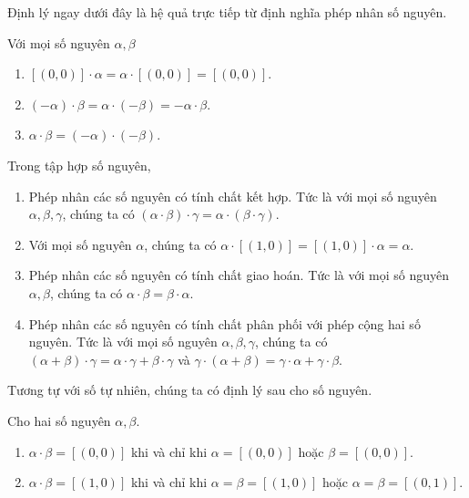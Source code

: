 Định lý ngay dưới đây là hệ quả trực tiếp từ định nghĩa phép nhân số nguyên.
\begin{theorem}
    Với mọi số nguyên $\alpha, \beta$
    \begin{enumerate}[label={(\roman*)}]
        \item $[(0, 0)]\cdot\alpha = \alpha\cdot[(0,0)] = [(0,0)]$.
        \item $(-\alpha)\cdot\beta = \alpha\cdot(-\beta) = -\alpha\cdot\beta$.
        \item $\alpha\cdot\beta = (-\alpha)\cdot(-\beta)$.
    \end{enumerate}
\end{theorem}

\begin{theorem}\label{theorem:property-of-integers-multiplication}
    Trong tập hợp số nguyên,
    \begin{enumerate}[label={(\roman*)}]
        \item Phép nhân các số nguyên có tính chất kết hợp. Tức là với mọi số nguyên $\alpha, \beta, \gamma$, chúng ta có $(\alpha\cdot\beta)\cdot\gamma = \alpha\cdot(\beta\cdot\gamma)$.
        \item Với mọi số nguyên $\alpha$, chúng ta có $\alpha\cdot [(1, 0)] = [(1, 0)]\cdot\alpha = \alpha$.
        \item Phép nhân các số nguyên có tính chất giao hoán. Tức là với mọi số nguyên $\alpha, \beta$, chúng ta có $\alpha\cdot\beta = \beta\cdot\alpha$.
        \item Phép nhân các số nguyên có tính chất phân phối với phép cộng hai số nguyên. Tức là với mọi số nguyên $\alpha, \beta, \gamma$, chúng ta có $(\alpha + \beta)\cdot\gamma = \alpha\cdot\gamma + \beta\cdot\gamma$ và $\gamma\cdot(\alpha + \beta) = \gamma\cdot\alpha + \gamma\cdot\beta$.
    \end{enumerate}
\end{theorem}

Tương tự với số tự nhiên, chúng ta có định lý sau cho số nguyên.
\begin{theorem}
    Cho hai số nguyên $\alpha, \beta$.
    \begin{enumerate}[label={(\roman*)}]
        \item $\alpha\cdot\beta = [(0,0)]$ khi và chỉ khi $\alpha = [(0,0)]$ hoặc $\beta = [(0,0)]$.
        \item $\alpha\cdot\beta = [(1,0)]$ khi và chỉ khi $\alpha = \beta = [(1, 0)]$ hoặc $\alpha = \beta = [(0,1)]$.
    \end{enumerate}
\end{theorem}

